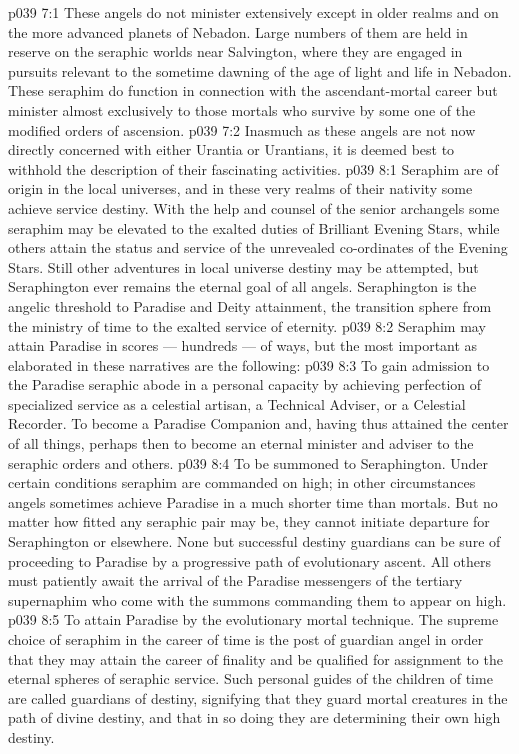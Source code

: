 \vs p039 7:1 These angels do not minister extensively except in older realms and on the more advanced planets of Nebadon. Large numbers of them are held in reserve on the seraphic worlds near Salvington, where they are engaged in pursuits relevant to the sometime dawning of the age of light and life in Nebadon. These seraphim do function in connection with the ascendant\hyp{}mortal career but minister almost exclusively to those mortals who survive by some one of the modified orders of ascension.
\vs p039 7:2 Inasmuch as these angels are not now directly concerned with either Urantia or Urantians, it is deemed best to withhold the description of their fascinating activities.
\vs p039 8:1 Seraphim are of origin in the local universes, and in these very realms of their nativity some achieve service destiny. With the help and counsel of the senior archangels some seraphim may be elevated to the exalted duties of Brilliant Evening Stars, while others attain the status and service of the unrevealed co\hyp{}ordinates of the Evening Stars. Still other adventures in local universe destiny may be attempted, but Seraphington ever remains the eternal goal of all angels. Seraphington is the angelic threshold to Paradise and Deity attainment, the transition sphere from the ministry of time to the exalted service of eternity.
\vs p039 8:2 \pc Seraphim may attain Paradise in scores --- hundreds --- of ways, but the most important as elaborated in these narratives are the following:
\vs p039 8:3 \bibnobreakspace To gain admission to the Paradise seraphic abode in a personal capacity by achieving perfection of specialized service as a celestial artisan, a Technical Adviser, or a Celestial Recorder. To become a Paradise Companion and, having thus attained the center of all things, perhaps then to become an eternal minister and adviser to the seraphic orders and others.
\vs p039 8:4 \pc {}\bibnobreakspace To be summoned to Seraphington. Under certain conditions seraphim are commanded on high; in other circumstances angels sometimes achieve Paradise in a much shorter time than mortals. But no matter how fitted any seraphic pair may be, they cannot initiate departure for Seraphington or elsewhere. None but successful destiny guardians can be sure of proceeding to Paradise by a progressive path of evolutionary ascent. All others must patiently await the arrival of the Paradise messengers of the tertiary supernaphim who come with the summons commanding them to appear on high.
\vs p039 8:5 \pc {}\bibnobreakspace To attain Paradise by the evolutionary mortal technique. The supreme choice of seraphim in the career of time is the post of guardian angel in order that they may attain the career of finality and be qualified for assignment to the eternal spheres of seraphic service. Such personal guides of the children of time are called guardians of destiny, signifying that they guard mortal creatures in the path of divine destiny, and that in so doing they are determining their own high destiny.
